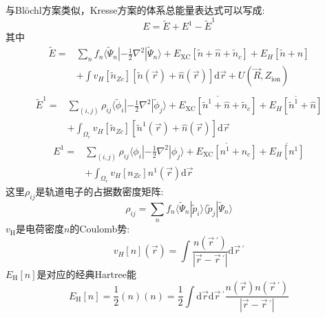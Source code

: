 与\textrm{Bl\"ochl}方案类似，\textrm{Kresse}方案的体系总能量表达式可以写成:
$$E=\tilde E+E^1-\tilde E^1$$其中
	\begin{equation}
		\begin{aligned}
			\tilde E=&\sum_nf_n\langle\tilde\Psi_n|-\frac12\nabla^2|\tilde\Psi_n\rangle+E_{\mathrm{XC}}[\tilde n+\hat n+\tilde n_c]+E_H[\tilde n+\hat n]\\
			&+\int v_H[\tilde n_{Zc}][\tilde n(\vec r)+\hat n(\vec r)]\mathrm{d}\vec r+U(\vec R,Z_{\mathrm{ion}})\\
		\end{aligned}
		\label{eq:PAW_Kresse_10-1}
	\end{equation}
	\begin{equation}
		\begin{aligned}
			\tilde E^1=&\sum_{(i,j)}\rho_{ij}\langle\tilde\phi_i|-\frac12\nabla^2|\tilde\phi_j\rangle+\overline{E_{\mathrm{XC}}[\tilde n^1+\hat n+\tilde n_c]}+\overline{E_H[\tilde n^1+\hat n]}\\
			&+\int_{\Omega_r}v_H[\tilde n_{Zc}][\tilde n^1(\vec r)+\hat n(\vec r)]\mathrm{d}\vec r
		\end{aligned}
		\label{eq:PAW_Kresse_10-2}
	\end{equation}
	\begin{equation}
		\begin{aligned}
			E^1=&\sum_{(i,j)}\rho_{ij}\langle\phi_i|-\frac12\nabla^2|\phi_j\rangle+\overline{E_{\mathrm{XC}}[n^1+n_c]}+\overline{E_H[n^1]}\\
			&+\int_{\Omega_r}v_H[n_{Zc}]n^1(\vec r)\mathrm{d}\vec r
		\end{aligned}
		\label{eq:PAW_Kresse_10-3}
	\end{equation}
这里$\rho_{ij}$是轨道电子的占据数密度矩阵:
\begin{displaymath}
	\rho_{ij}=\sum_nf_n\langle\tilde\Psi_n|\tilde p_i\rangle\langle\tilde p_j|\tilde\Psi_n\rangle
\end{displaymath}
$v_{\mathrm{H}}$是电荷密度$n$的\textrm{Coulomb}势:
\begin{displaymath}
	v_H[n](\vec r)=\int\dfrac{n(\vec r\,^{\prime})}{|\vec r-\vec r\,^{\prime}|}\mathrm{d}\vec r\,^{\prime}
\end{displaymath}
$E_{\mathrm H}[n]$是对应的经典\textrm{Hartree}能
\begin{displaymath}
	E_{\mathrm H}[n]=\dfrac12(n)(n)=\dfrac12\int\mathrm{d}\vec r\mathrm{d}\vec r\,^{\prime}\dfrac{n(\vec r)n(\vec r\,^{\prime})}{|\vec r-\vec r\,^{\prime}|}
\end{displaymath}

